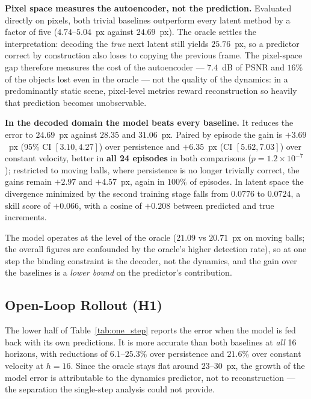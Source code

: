 \documentclass[conference]{IEEEtran}
\begin{document}
\textbf{Pixel space measures the autoencoder, not the prediction.} Evaluated directly on pixels, both trivial baselines outperform every latent method by a factor of five ($4.74$--$5.04$~px against $24.69$~px). The oracle settles the interpretation: decoding the \emph{true} next latent still yields $25.76$~px, so a predictor correct by construction also loses to copying the previous frame. The pixel-space gap therefore measures the cost of the autoencoder --- $7.4$~dB of PSNR and $16\%$ of the objects lost even in the oracle --- not the quality of the dynamics: in a predominantly static scene, pixel-level metrics reward reconstruction so heavily that prediction becomes unobservable.

\textbf{In the decoded domain the model beats every baseline.} It reduces the error to $24.69$~px against $28.35$ and $31.06$~px. Paired by episode the gain is $+3.69$~px (95\% CI $[3.10, 4.27]$) over persistence and $+6.35$~px (CI $[5.62, 7.03]$) over constant velocity, better in \textbf{all 24 episodes} in both comparisons ($p = 1.2 \times 10^{-7}$); restricted to moving balls, where persistence is no longer trivially correct, the gains remain $+2.97$ and $+4.57$~px, again in $100\%$ of episodes. In latent space the divergence minimized by the second training stage falls from $0.0776$ to $0.0724$, a skill score of $+0.066$, with a cosine of $+0.208$ between predicted and true increments.

The model operates at the level of the oracle ($21.09$ vs $20.71$~px on moving balls; the overall figures are confounded by the oracle's higher detection rate), so at one step the binding constraint is the decoder, not the dynamics, and the gain over the baselines is a \emph{lower bound} on the predictor's contribution.

\subsection{Open-Loop Rollout (H1)}

The lower half of Table~\ref{tab:one_step} reports the error when the model is fed back with its own predictions. It is more accurate than both baselines at \emph{all} 16 horizons, with reductions of $6.1$--$25.3\%$ over persistence and $21.6\%$ over constant velocity at $h = 16$. Since the oracle stays flat around $23$--$30$~px, the growth of the model error is attributable to the dynamics predictor, not to reconstruction --- the separation the single-step analysis could not provide.
\end{document}
